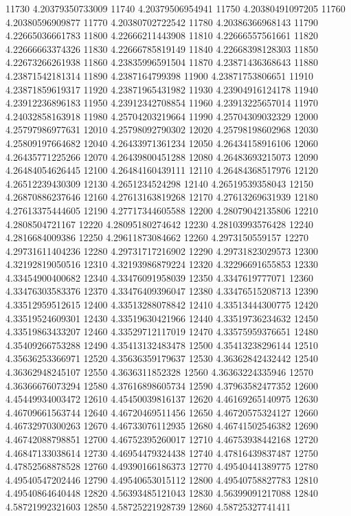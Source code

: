 {11730 4.20379350733009
11740 4.20379506954941
11750 4.20380491097205
11760 4.20380596909877
11770 4.20380702722542
11780 4.20386366968143
11790 4.22665036661783
11800 4.22666211443908
11810 4.22666557561661
11820 4.22666663374326
11830 4.22666785819149
11840 4.22668398128303
11850 4.22673266261938
11860 4.23835996591504
11870 4.23871436368643
11880 4.23871542181314
11890 4.2387164799398
11900 4.23871753806651
11910 4.23871859619317
11920 4.23871965431982
11930 4.23904916124178
11940 4.23912236896183
11950 4.23912342708854
11960 4.23913225657014
11970 4.24032858163918
11980 4.25704203219664
11990 4.25704309032329
12000 4.25797986977631
12010 4.25798092790302
12020 4.25798198602968
12030 4.25809197664682
12040 4.26433971361234
12050 4.26434158916106
12060 4.26435771225266
12070 4.26439800451288
12080 4.26483693215073
12090 4.26484054626445
12100 4.26484160439111
12110 4.26484368517976
12120 4.26512239430309
12130 4.2651234524298
12140 4.26519539358043
12150 4.26870886237646
12160 4.27613163819268
12170 4.27613269631939
12180 4.27613375444605
12190 4.27717344605588
12200 4.28079042135806
12210 4.2808504721167
12220 4.28095180274642
12230 4.28103993576428
12240 4.2816684009386
12250 4.29611873084662
12260 4.2973150559157
12270 4.29731611404236
12280 4.29731717216902
12290 4.29731823029573
12300 4.32192819050516
12310 4.32193986879224
12320 4.32296691655853
12330 4.33454900400682
12340 4.33476091958039
12350 4.3347619777071
12360 4.33476303583376
12370 4.33476409396047
12380 4.33476515208713
12390 4.33512959512615
12400 4.33513288078842
12410 4.33513444300775
12420 4.33519524609301
12430 4.33519630421966
12440 4.33519736234632
12450 4.33519863433207
12460 4.33529712117019
12470 4.33575959376651
12480 4.35409266753288
12490 4.35413132483478
12500 4.35413238296144
12510 4.35636253366971
12520 4.35636359179637
12530 4.36362842432442
12540 4.36362948245107
12550 4.3636311852328
12560 4.36363224335946
12570 4.36366676073294
12580 4.37616898605734
12590 4.37963582477352
12600 4.45449934003472
12610 4.45450039816137
12620 4.46169265140975
12630 4.46709661563744
12640 4.46720469511456
12650 4.46720575324127
12660 4.46732970300263
12670 4.46733076112935
12680 4.46741502546382
12690 4.46742088798851
12700 4.46752395260017
12710 4.46753938442168
12720 4.46847133038614
12730 4.46954479324438
12740 4.47816439837487
12750 4.47852568878528
12760 4.49390166186373
12770 4.49540441389775
12780 4.49540547202446
12790 4.49540653015112
12800 4.49540758827783
12810 4.49540864640448
12820 4.56393485121043
12830 4.56399091217088
12840 4.58721992321603
12850 4.58725221928739
12860 4.58725327741411
}
